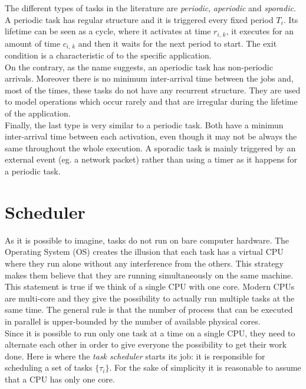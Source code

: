 The different types of tasks in the literature are \emph{periodic},
\emph{aperiodic} and \emph{sporadic}.\\
A periodic task has regular structure
and it is triggered every fixed period \( T_{i} \). Its lifetime can be seen as
a cycle, where it activates at time \( r_{i,\,k} \), it executes for an amount 
of time \( c_{i,\,k} \) and then it waits for the next period to start. The exit
condition is a characteristic of to the specific application.\\
On the contrary, as the name suggests, an aperiodic task has non-periodic arrivals.
Moreover there is no minimum inter-arrival time between the jobs and,
most of the times, these tasks do not have any recurrent structure. They are used
to model operations which occur rarely and that are irregular during the lifetime
of the application.\\
Finally, the last type is very similar to a periodic task. Both have a minimun
inter-arrival time between each activation, even though it may not be always the
same throughout the whole execution. A sporadic task is mainly triggered by an
external event (eg. a network packet) rather than using a timer as it happens
for a periodic task.


\section{Scheduler}
As it is possible to imagine, tasks do not run on bare computer hardware.
The Operating System (OS) creates the illusion that each task has a virtual CPU
where they run alone without any interference from the others.
This strategy makes them believe that they are running simultaneously on the same
machine. This statement is true if we think of a single CPU with one core. Modern
CPUs are multi-core and they give the possibility to actually run multiple tasks
at the same time. The general rule is that the number of process that can be
executed in parallel is upper-bounded by the number of available physical cores.\\
Since it is possible to run only one task at a time on a single CPU, they need
to alternate each other in order to give everyone the possibility to get their
work done. Here is where the \emph{task scheduler} starts its job: it is
responsible for scheduling a set of tasks \( \{\tau_{i}\} \). For the
sake of simplicity it is reasonable to assume that a CPU has only one core.

